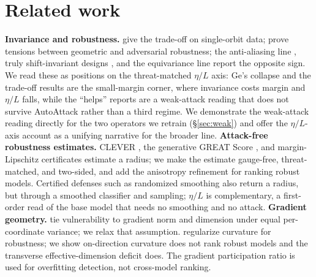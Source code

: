 \documentclass{article}
\theoremstyle{definition}
\newcommand{\etaL}{\eta/L}
\begin{document}
\section{Related work}\label{sec:related}
\textbf{Invariance and robustness.} \citet{ge2021shift} give the trade-off on single-orbit data;
\citet{kamath2021canwehaveitall,tramer2019multiple} prove tensions between geometric and adversarial
robustness; the anti-aliasing line \citep{zhang2019making,grabinski2022aliasing,saha2024improving},
truly shift-invariant designs \citep{chaman2021truly}, and the equivariance line \citep{wang2025bridging}
report the opposite sign. We read these as positions on the threat-matched $\etaL$ axis: Ge's collapse
and the trade-off results are the small-margin corner, where invariance costs margin and $\etaL$ falls,
while the ``helps'' reports are a weak-attack reading that does not survive AutoAttack rather than a third
regime. We demonstrate the weak-attack reading directly for the two operators we retrain
(\S\ref{sec:weak}) and offer the $\etaL$-axis account as a unifying narrative for the broader line.
\textbf{Attack-free robustness estimates.} CLEVER \citep{clever}, the generative GREAT Score
\citep{greatscore}, and margin-Lipschitz certificates \citep{hein2017formal,tsuzuku2018lipschitz}
estimate a radius; we make the estimate gauge-free, threat-matched, and two-sided, and add the anisotropy
refinement for ranking robust models. Certified defenses such as randomized smoothing
\citep{cohen2019certified} also return a radius, but through a smoothed classifier and sampling; $\etaL$
is complementary, a first-order read of the base model that needs no smoothing and no attack.
\textbf{Gradient geometry.} \citet{simongabriel2019adversarial} tie vulnerability to gradient norm and
dimension under equal per-coordinate variance; we relax that assumption. \citet{moosavi2019curvature}
regularize curvature for robustness; we show on-direction curvature does not rank robust models and the
transverse effective-dimension deficit does. The gradient participation ratio \citep{participation2025}
is used for overfitting detection, not cross-model ranking.

\end{document}
